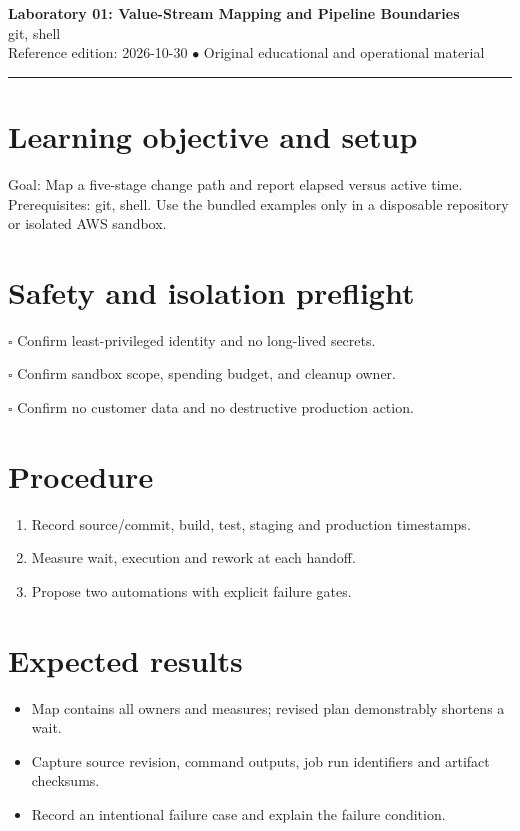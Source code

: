 \documentclass[10pt,letterpaper]{article}
\begin{document}
\begin{center}
{\LARGE\bfseries\color{cdblue}Laboratory 01: Value-Stream Mapping and Pipeline Boundaries}\\[7pt]
{\large git, shell}\\[6pt]
{\small Reference edition: 2026-10-30 $\bullet$ Original educational and operational material}
\end{center}
\noindent\color{cdblue}\rule{\linewidth}{1.2pt}\color{black}
\vspace{0.4em}
\section{Learning objective and setup}
Goal: Map a five-stage change path and report elapsed versus active time. Prerequisites: git, shell. Use the bundled examples only in a disposable repository or isolated AWS sandbox.


\section{Safety and isolation preflight}
\noindent $\square$ Confirm least-privileged identity and no long-lived secrets.\par\vspace{0.35em}
\noindent $\square$ Confirm sandbox scope, spending budget, and cleanup owner.\par\vspace{0.35em}
\noindent $\square$ Confirm no customer data and no destructive production action.\par\vspace{0.35em}

\section{Procedure}
\begin{enumerate}
\item Record source/commit, build, test, staging and production timestamps.
\item Measure wait, execution and rework at each handoff.
\item Propose two automations with explicit failure gates.
\end{enumerate}

\section{Expected results}
\begin{itemize}
\item Map contains all owners and measures; revised plan demonstrably shortens a wait.
\item Capture source revision, command outputs, job run identifiers and artifact checksums.
\item Record an intentional failure case and explain the failure condition.
\end{itemize}
\end{document}
